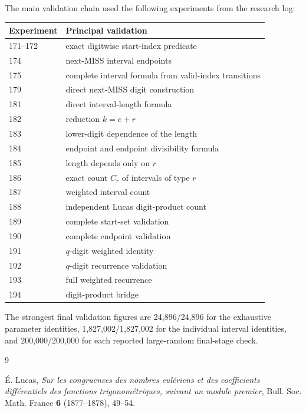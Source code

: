 \documentclass[11pt,a4paper]{article}
\theoremstyle{definition}
\theoremstyle{remark}
\begin{document}
The main validation chain used the following experiments from the research log:
\begin{center}
\begin{tabular}{@{}ll@{}}
\toprule
Experiment & Principal validation \\
\midrule
171--172 & exact digitwise start-index predicate \\
174 & next-MISS interval endpoints \\
175 & complete interval formula from valid-index transitions \\
179 & direct next-MISS digit construction \\
181 & direct interval-length formula \\
182 & reduction $k=e+r$ \\
183 & lower-digit dependence of the length \\
184 & endpoint and endpoint divisibility formula \\
185 & length depends only on $r$ \\
186 & exact count $C_r$ of intervals of type $r$ \\
187 & weighted interval count \\
188 & independent Lucas digit-product count \\
189 & complete start-set validation \\
190 & complete endpoint validation \\
191 & $q$-digit weighted identity \\
192 & $q$-digit recurrence validation \\
193 & full weighted recurrence \\
194 & digit-product bridge \\
\bottomrule
\end{tabular}
\end{center}

The strongest final validation figures are 24,896/24,896 for the exhaustive parameter identities, 1,827,002/1,827,002 for the individual interval identities, and 200,000/200,000 for each reported large-random final-stage check.

\begin{thebibliography}{9}

É. Lucas,
\emph{Sur les congruences des nombres eulériens et des coefficients différentiels des fonctions trigonométriques, suivant un module premier},
Bull. Soc. Math. France \textbf{6} (1877--1878), 49--54.

\end{thebibliography}
\end{document}
